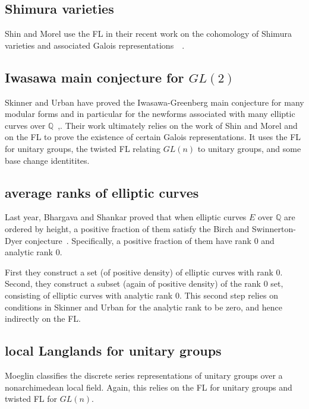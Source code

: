 \documentclass[brochure,english,12pt]{bourbaki}
\newcommand{\ring}[1]{\mathbb{#1}}
\begin{document}
\subsection{Shimura varieties}

Shin and Morel use the FL in their recent work on the cohomology of Shimura varieties and associated
Galois representations~\cite{Shin:2010}~\cite{Morel:2010}.

\subsection{Iwasawa main conjecture for $GL(2)$}

Skinner and Urban have proved the Iwasawa-Greenberg main conjecture for
many modular forms and in particular for the newforms associated with
many elliptic curves over $\ring{Q}$~\cite{Skinner-Urban:2010},\cite{Skinner:2010}.  Their work ultimately
relies on the work of Shin and Morel and on the FL to prove the
existence of certain Galois representations.  It uses the FL for unitary
groups, the twisted FL relating $GL(n)$ to unitary groups, and some
base change identitites.

\subsection{average ranks of elliptic curves}

Last year, Bhargava and Shankar proved that
when elliptic curves $E$ over $\ring{Q}$ are ordered
  by height, a positive fraction of them satisfy the Birch and
  Swinnerton-Dyer conjecture~\cite{BS:2010}.  Specifically, a positive fraction of them
  have rank $0$ and analytic rank $0$.


First they construct a set (of positive
density) of elliptic curves with rank $0$.  Second, they construct a
subset (again of positive density) of the rank $0$ set, consisting of
elliptic curves with analytic rank $0$.  This second step relies on
conditions in Skinner and Urban for the analytic rank to be zero, and hence
indirectly on the FL.

\subsection{local Langlands for unitary groups}

Moeglin classifies the discrete series representations of unitary
groups over a nonarchimedean local field.  Again, this relies on the
FL for unitary groups and twisted FL for $GL(n)$.
\end{document}
